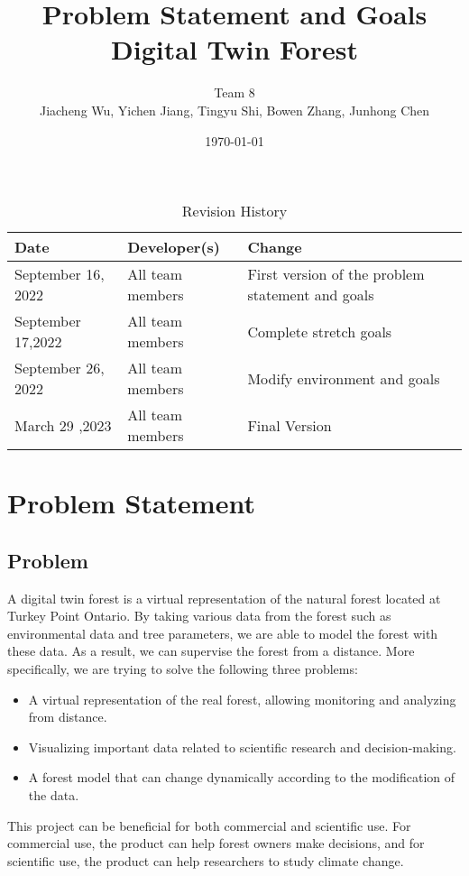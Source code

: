 \documentclass{article}
\title{Problem Statement and Goals\\ Digital Twin Forest}
\author{Team 8\\Jiacheng Wu, Yichen Jiang, Tingyu Shi, Bowen Zhang, Junhong Chen}
\date{\today}
\begin{document}
\maketitle

\begin{table}[hp]
\centering
\caption{Revision History} \label{TblRevisionHistory}
\begin{tabularx}{11cm}{X X X}
\toprule
\textbf{Date} & \textbf{Developer(s)} & \textbf{Change}\\
\midrule
September 16, 2022 & All team members & First version
of the problem statement and goals\\
\hline
September 17,2022 & All team members & Complete stretch
goals\\
\hline
September 26, 2022 & All team members & Modify environment 
and goals\\
\hline
March 29 ,2023 & All team members & Final Version\\
\bottomrule
\end{tabularx}
\end{table}

\section{Problem Statement}
\subsection{Problem}
A digital twin forest is a virtual representation of the 
natural forest located at Turkey Point Ontario. By taking
various data from the forest such as environmental data 
and tree parameters, we are able to model the forest with
these data. As a result, we can supervise the forest from a
distance. More specifically, we are trying to solve the 
following three problems:
\begin{itemize}
\item A virtual representation of the real forest,
allowing monitoring and analyzing from distance.
\item Visualizing important data related to scientific 
research and decision-making.
\item A forest model that can change dynamically 
according to the modification of the data.
\end{itemize}
This project can be beneficial for both commercial and scientific use. For commercial use, the product can help forest owners make decisions, and for scientific use, the product can help researchers to study climate change.
\end{document}
